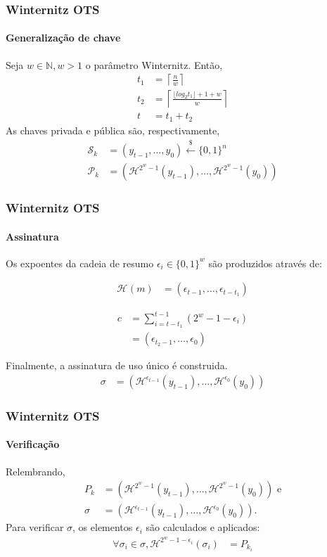 \documentclass[12pt]{beamer}
\newcommand{\hash}[2][]{\mathcal{H}^{#1}(#2)}
\begin{document}
\begin{frame}
  \frametitle{Winternitz OTS}
  \framesubtitle{Generalização de chave}
  Seja $w \in \mathbb{N}, w > 1$ o parâmetro Winternitz. Então,
   \begin{align*}
       t_1 &= \left\lceil \frac{n}{w} \right\rceil \\
       t_2 &= \left\lceil
       \frac{\lfloor log_2 t_1 \rfloor + 1 + w}{w} \right\rceil \\
         t &= t_1 + t_2
   \end{align*}
   As chaves privada e pública são, respectivamente,
   \begin{align*}
      \mathcal{S}_k &= (y_{t - 1}, \dots, y_{0})
        \stackrel{\$}{\longleftarrow} \{0,1\}^n \\
      \mathcal{P}_k &= (\hash[2^w - 1]{y_{t - 1}}, \dots, \hash[2^w - 1]{y_0})
   \end{align*}
\end{frame}

\begin{frame}
  \frametitle{Winternitz OTS}
  \framesubtitle{Assinatura}
  Os expoentes da cadeia de resumo $\epsilon_i \in \{0, 1\}^w$
  são produzidos através de:
  \begin{minipage}{.45\linewidth}
  \begin{align*}
    \hash{m} &= (\epsilon_{t - 1}, \dots, \epsilon_{t - t_1})
  \end{align*}
  \end{minipage}
  \begin{minipage}{.45\linewidth}
  \begin{align*}
    c &= \sum_{i = t - t_1}^{t - 1} (2^w - 1 - \epsilon_i) \\
      &= (\epsilon_{t_2 - 1}, \dots, \epsilon_{0})
  \end{align*}
  \end{minipage}
  \vspace{4mm}
  
  Finalmente, a assinatura de uso único é construida.
  \begin{align*}
    \sigma &= (\mathcal{H}^{\epsilon_{t - 1}}(y_{t - 1}),
    \dots, \mathcal{H}^{\epsilon_0}(y_0))
  \end{align*}
\end{frame}

\begin{frame}
  \frametitle{Winternitz OTS}
  \framesubtitle{Verificação}
  Relembrando,
  \begin{align*}
    P_k &= (\hash[2^w - 1]{y_{t - 1}}, \dots, \hash[2^w - 1]{y_0}) \text{ e} \\
    \sigma &= (\mathcal{H}^{\epsilon_{t - 1}}(y_{t - 1}), \dots, \mathcal{H}^{\epsilon_0}(y_0)).
  \end{align*}
  Para verificar $\sigma$, os elementos $\epsilon_i$ são calculados e aplicados:
  \begin{align*}
    \forall \sigma_i \in \sigma,
        \hash[2^w - 1 - \epsilon_{i}]{\sigma_i} &= P_{k_i}
  \end{align*}
\end{frame}
\end{document}
